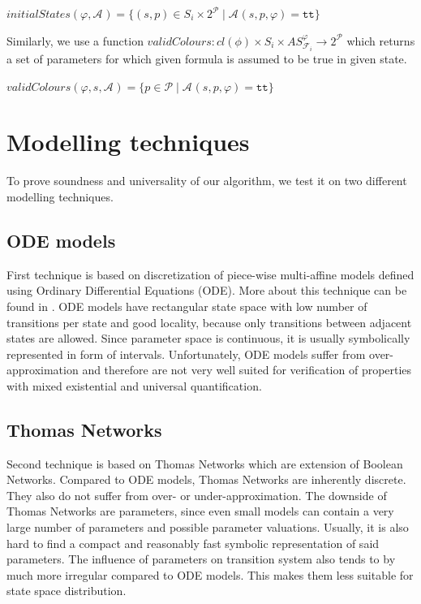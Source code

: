 \documentclass[12pt,oneside]{fithesis2}
\newcommand{\as}[1][]{\ensuremath{\mathcal{A}_{#1}}}
\newcommand{\ASphi}{\ensuremath{AS_{\kf{i}{}}^\varphi}}
\newcommand{\true}{\ensuremath{\texttt{tt}}}
\newcommand{\kf}[2]{\ensuremath{\mathcal{F}^{#2}_{#1}}}
\newcommand{\params}{\mathcal{P}}
\begin{document}
			\begin{center}
				$initialStates(\varphi, \as) = \{ (s, p) \in S_i \times 2^\params \mid \as(s, p, \varphi) = \true \} $
			\end{center}			

		   Similarly, we use a function $validColours : cl(\phi) \times S_i \times \ASphi \rightarrow 2^\mathcal{P}	$ which returns a set of parameters for which given formula is assumed to be true in given state. 
			
			\begin{center}
				$validColours(\varphi, s, \as) = \{ p \in \params \mid \as(s, p, \varphi) = \true \}$
			\end{center}			

	\chapter{Modelling techniques}
	
			To prove soundness and universality of our algorithm, we test it on two different modelling techniques. 

		\section{ODE models}	
				
			First technique is based on discretization of piece-wise multi-affine models defined using Ordinary Differential Equations (ODE). More about this technique can be found in \cite{IFAC}. ODE models have rectangular state space with low number of transitions per state and good locality, because only transitions between adjacent states are allowed. Since parameter space is continuous, it is usually symbolically represented in form of intervals. Unfortunately, ODE models suffer from over-approximation and therefore are not very well suited for verification of properties with mixed existential and universal quantification.
	
		\section{Thomas Networks}
			Second technique is based on Thomas Networks \cite{Thomas} which are extension of Boolean Networks. Compared to ODE models, Thomas Networks are inherently discrete. They also do not suffer from over- or under-approximation. The downside of Thomas Networks are parameters, since even small models can contain a very large number of parameters and possible parameter valuations. Usually, it is also hard to find a compact and reasonably fast symbolic representation of said parameters. The influence of parameters on transition system also tends to by much more irregular compared to ODE models. This makes them less suitable for state space distribution.
			
\end{document}
